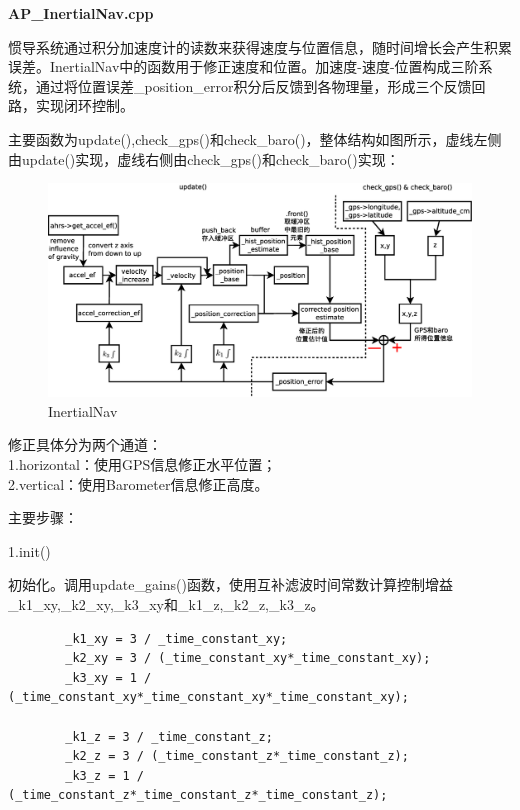 \documentclass[a4paper,10pt]{ctexart} %
\begin{document}
\begin{center}
\textbf{AP\_InertialNav.cpp}
\end{center}

惯导系统通过积分加速度计的读数来获得速度与位置信息，随时间增长会产生积累误差。InertialNav中的函数用于修正速度和位置。加速度-速度-位置构成三阶系统，通过将位置误差\_position\_error积分后反馈到各物理量，形成三个反馈回路，实现闭环控制。

主要函数为update(),check\_gps()和check\_baro()，整体结构如图所示，虚线左侧由update()实现，虚线右侧由check\_gps()和check\_baro()实现：
\begin{figure}[!htb]\centering
\includegraphics[scale=0.3]{InertialNav_update.eps}
\caption{InertialNav}\label{fig:InertialNav_update} %
\end{figure}


\noindent 修正具体分为两个通道：\\
1.horizontal：使用GPS信息修正水平位置；\\
2.vertical：\phantom{tal}使用Barometer信息修正高度。

\vspace{10pt}
\noindent 主要步骤：

\noindent 1.init()

初始化。调用update\_gains()函数，使用互补滤波时间常数计算控制增益\_k1\_xy,\_k2\_xy,\_k3\_xy和\_k1\_z,\_k2\_z,\_k3\_z。
\begin{lstlisting}
        _k1_xy = 3 / _time_constant_xy;
        _k2_xy = 3 / (_time_constant_xy*_time_constant_xy);
        _k3_xy = 1 / (_time_constant_xy*_time_constant_xy*_time_constant_xy);
        
        _k1_z = 3 / _time_constant_z;
        _k2_z = 3 / (_time_constant_z*_time_constant_z);
        _k3_z = 1 / (_time_constant_z*_time_constant_z*_time_constant_z);
\end{lstlisting}
\end{document}
